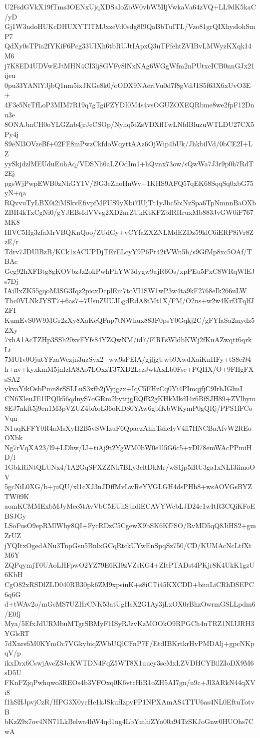 U2FsdGVkX19fTms3OENxUjqXDSaIoZbW0vbW5IljVwkaVa64zVQ+LL9dK5kaC/yD
Gj1W3ndoHUKcDHUXYTITMJxzeVd0sdg8I9QaBbTuITL/Vzo81grQIXhysIohSmP7
QdXy0sTPia2fYKiF6Pcg33UIXh6tbRUJtIApxQ3uTFfehtZVIBvLMWyzKXqk14M6
j7K8ED4UDVwEJtMHN4CI3lj8GVFy8lNxNAg6WGgWfm2nPUtxcICB0nnGJx21ijeu
0pu33YANlYJjbQ1nm5ixJKGe8k0/oODX9NAeriVu0d7f8gVdJ1S5f63X6xUvO3E+
4F3e5NrTfLoP3MIM7R19q7gTgiFZYDI0M4s4vsOGUZOXEQRbme8we2fpF12Dnu3e
8ONAJmCH0oYLGZab4jrJeCSOp/Nyhq5tZsVDXflTwLNfdBluzuWTLDU27CX5Py4j
S9eNl3OVzeBf+02FE8mPwzCkfdoWqyttAAz6OjWip4bUk/JhkbilVd/0bCE2I+LZ
yySkjdzlMEUduEuhAq/VDSNh6aLZOdIm1+hQvnx73ow/sQwWa7J3r9p0h7RdT2Ej
pgsWjPwpEWB0zNhGY1V/l9G3eZhoHnWv+1KHS9AFQ57qEK68SqqSq0xbG75yN+qa
RQvvuTyLBX0i2iMSkvEfivpfMFUS9yXbi7IUjTt1yJbc5biNzSpa6TpNmnnBaOXb
ZBH4kTxCgNi0/gYJEBsIdVVvg2XD2nrZUkKtKFZbIRHruxMb883JvGW0iF767MK8
HlVC5Hg3zfaMrVBQKnQoo/ZUdGy+vCYfaZXZNLMdEZDz59klC6iERP8iVr8ZzE/r
Tdrv7JDUlBzB/KCk1zACUPDjTErELcyY9P6Pt42tVWn5h/s9GfMp8xc5OAf/TBAe
Gcg92hXFBtg8gKOVbzJz2okPwhPhYW3dygw9ajR6Os/xpPEu5PxC8WRqWlEJs7Dj
IAilIxZK55gqoM3SG3Iqz2pioxDcplEm7toVI1SW1wP3w4ta9kF2768eIk266uLW
Thc0VLNkJYST7+6as7+7UsuZUUJLgdRdA8tMt1X/FM/O2ns+w2w4Krf3TqlfJZFI
KumEvS0W9MGr2zXy8XaKcQFnp7tNWhux883F0psY0Gqkj2C/gFYfaSa2mydz5ZXy
7xhA1AcTZHp3SSh20zvFYfs84YZQwNM/id7/FlRFsWldbKWj2fKuAZwqtt6qrkLi
7MUIv0OjutYFzaWezjn3uzSyx2+ww9sPElA/gjljgUwb9XwdXaiKnHFy+tS8ci94
h+nv+kyxkmM5jnIzlA8Ao7LOxzT37XD2LczJwtAxLb0Fse+PQHX/O+9FHgFXsSA2
ykvaYikOsbPmn8rSSLLuS3xfb2jVyjgzx+IqC5FHzCq0Yi4PImqjfjC9IrhJGlmI
CN6XleuJE1lPQlk56qdnyS7oGRm2bytrjgEQfR2gKHkMkdI4z6BfSJH89+ZVlbym
8EJ7nkft5j9cn1M3pVZUZ4bAoL36oKDS0YAw6gbfKbWKymP0gQRj/PPS1fFCoVqn
N1uqKFFY0R4aMsXyH2B5vSWIzuF6QpaezAhhTshcIyV4fi7HNCBaAfvW2REoOXbk
Ng7rVqXA23/l9+LDhw/IJ+tiAj9t2YgWM0bW0e1l5G6c5+xDl78emWAcPPmiHD/l
1GbkRiNtQLUNx4/1A2GqSFXZZNk7BLy3cltDkMr/wS1jp5iRU3ga1xNLI3iimoOV
5gcNiL0XG/b+juQU/xl1cXJ3nJDffMvLwReYVGLGH4dsPHh8+wsAOVGsBYZTW09K
aomKCMMExbMJyMec5tAvVbC5EUhSjhdiECAVYWcbLJD24c1wItR3CQiKFoEBSJGy
LSoFusO9epRMlWby8QI+FycRDzC5CgewX9bSK6Kf7SO/RvMD5qQ8JiHS2+gmZrUZ
jYQItxOgedANu3TnpGsu5BnlxGCqRtckUYwEnSpqSz750/CD/KUMAcNcLtfXtM6Y
ZQPqymjT0UAoLHFpwO2YZ79E6KI9zVZsKG4+ZItPTADst4PKjr8K4UkK1gzU6KbH
CgO82xRSDlZLD040RB30pk6ZM9xpsiuK+s8iCTi45KXCDD+bimLiCRhDSEPC6q6G
d+tWAv2o/mGsMS7UZHrCNK53atUgHsX2G1Ay3jLxOX0rBhzOwrmGSLLpdm6/E0fj
Mya/5EfxJdURMbuMTgrSBMyF1ISyRJzvKzMOOkO9RPGCh4uTRZ1NIJJRH3YGlsRT
7dXnrs6M0KYmOc7VGkybiqZWbUQlCFnP7F/EtdIBKrtkrHvPMDAlj+gpcNKpqV/p
ikxDrx6CswjAvcZSJcKWTDN4FqZ5WT8X1uucy3scMxLZVDHCYBilZIoDX9M6sD5U
FKnFZjqPwhqwo3REOs4b3VFOxq0K6vtcHiR1oZH5AI7gn/u9c+Jl3ARkN44qXVi8
f1hSHJpvjCzR/HPG3X0ycHe1kJSkufIzpyFP1NPXAmAS4TTU6as4NL0EftuTotvB
bKzZ9x7ov4NN71LkBelwa4hW4qd1ng4LbYmhiZYo00a94TzSKJoGnw0HUOhs7CwA
